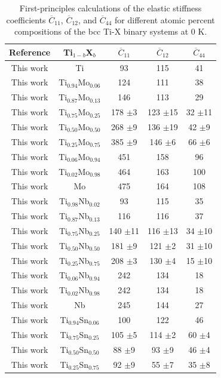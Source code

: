 \newpage
\begin{longtable}[H]{ c c c c c}
	\caption{First-principles calculations of the elastic stiffness coefficients $\overline{C}_{11}$, $\overline{C}_{12}$, and $\overline{C}_{44}$ for different atomic percent compositions of the bcc Ti-X binary systems at 0 K.}	\label{Ch5-table:tixelassc} \\
	\hline
	Reference & Ti$_{1-b}$X$_b$ & $\overline{C}_{11}$ & $\overline{C}_{12}$ & $\overline{C}_{44}$\\
	\hline
	\endhead
	\hline
	\endfoot
	This work & Ti & 93 & 115 & 41\\
	This work & Ti$_{0.94}$Mo$_{0.06}$ & 124 & 111 & 38\\
	This work & Ti$_{0.87}$Mo$_{0.13}$ & 146 & 113 & 29\\
	This work & Ti$_{0.75}$Mo$_{0.25}$ & 178 $\pm$3 & 123 $\pm$15 & 32 $\pm$11\\
	This work & Ti$_{0.50}$Mo$_{0.50}$ & 268 $\pm$9 & 136 $\pm$19 & 42 $\pm$9\\
	This work & Ti$_{0.25}$Mo$_{0.75}$ & 385 $\pm$9 & 146 $\pm$6 & 66 $\pm$6\\
	This work & Ti$_{0.06}$Mo$_{0.94}$ & 451 & 158 & 96\\
	This work & Ti$_{0.02}$Mo$_{0.98}$ & 464 & 163 & 100\\
	This work & Mo & 475 & 164 & 108\\
	This work & Ti$_{0.98}$Nb$_{0.02}$ & 93 & 115 & 35\\
	This work & Ti$_{0.87}$Nb$_{0.13}$ & 116 & 116 & 37\\
	This work & Ti$_{0.75}$Nb$_{0.25}$ & 140 $\pm$11 & 116 $\pm$13 & 34 $\pm$10\\
	This work & Ti$_{0.50}$Nb$_{0.50}$ & 181 $\pm$9 & 121 $\pm$2 & 31 $\pm$10\\
	This work & Ti$_{0.25}$Nb$_{0.75}$ & 208 $\pm$3 & 130 $\pm$4 & 15 $\pm$10\\
	This work & Ti$_{0.06}$Nb$_{0.94}$ & 242 & 134 & 18\\
	This work & Ti$_{0.02}$Nb$_{0.98}$ & 242 & 134 & 18\\
	This work & Nb & 245 & 144 & 27\\
	This work & Ti$_{0.94}$Sn$_{0.06}$ & 100 & 122 & 46 \\
	This work & Ti$_{0.75}$Sn$_{0.25}$ & 105 $\pm$5 & 114 $\pm$2 & 60 $\pm$4\\
	This work & Ti$_{0.50}$Sn$_{0.50}$ & 88 $\pm$9 & 93 $\pm$9 & 46 $\pm$4\\
	This work & Ti$_{0.25}$Sn$_{0.75}$ & 92 $\pm$9 & 55 $\pm$7 & 35 $\pm$8\\

\end{longtable}
